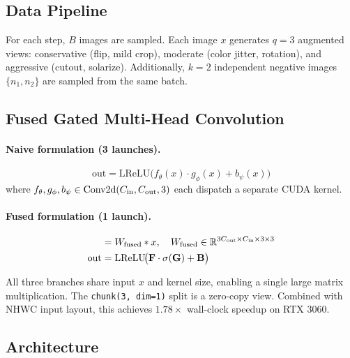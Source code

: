 \documentclass[10pt,twocolumn]{article}
\begin{document}
\subsection{Data Pipeline}

For each step, $B$ images are sampled. Each image $x$ generates $q{=}3$
augmented views: conservative (flip, mild crop), moderate (color jitter,
rotation), and aggressive (cutout, solarize). Additionally, $k{=}2$ independent
negative images $\{n_1,n_2\}$ are sampled from the same batch.

\subsection{Fused Gated Multi-Head Convolution}

\paragraph{Naive formulation (3 launches).}
\begin{equation}
\mathrm{out} = \mathrm{LReLU}\!\bigl(f_\theta(x)\cdot g_\phi(x) + b_\psi(x)\bigr)
\label{eq:naive}
\end{equation}
where $f_\theta, g_\phi, b_\psi \in \mathrm{Conv2d}(C_{\rm in}, C_{\rm out}, 3)$
each dispatch a separate CUDA kernel.

\paragraph{Fused formulation (1 launch).}
\begin{align}
[\mathbf{F}, \mathbf{G}, \mathbf{B}] &= W_{\rm fused} * x,
  \quad W_{\rm fused} \in \mathbb{R}^{3C_{\rm out} \times C_{\rm in} \times 3 \times 3}
  \label{eq:fused_conv} \\
\mathrm{out} &= \mathrm{LReLU}\!\bigl(\mathbf{F}\cdot\sigma(\mathbf{G}) + \mathbf{B}\bigr)
  \label{eq:fused_gate}
\end{align}

All three branches share input $x$ and kernel size, enabling a single large
matrix multiplication. The \texttt{chunk(3, dim=1)} split is a zero-copy view.
Combined with NHWC input layout, this achieves $1.78\times$ wall-clock speedup
on RTX 3060.

\subsection{Architecture}
\end{document}
